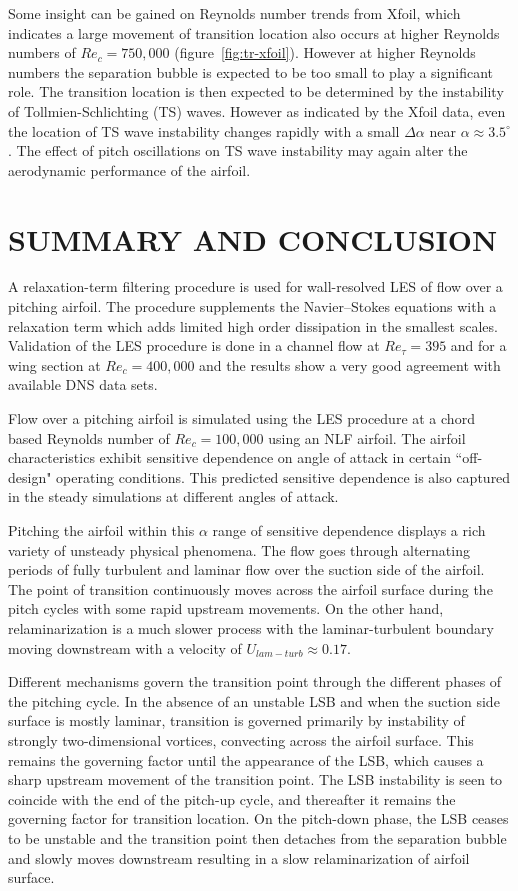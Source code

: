 \documentclass[twocolumn,10pt]{tsfp}
\begin{document}
Some insight can be gained on Reynolds number trends from Xfoil, which indicates a large movement of transition location also occurs at higher Reynolds numbers of $Re_{c}=750,000$ (figure~\ref{fig:tr-xfoil}). However at higher Reynolds numbers the separation bubble is expected to be too small to play a significant role. The transition location is then expected to be determined by the instability of Tollmien-Schlichting (TS) waves. However as indicated by the Xfoil data, even the location of TS wave instability changes rapidly with a small $\Delta\alpha$ near $\alpha\approx 3.5^{\circ}$. The effect of pitch oscillations on TS wave instability may again alter the aerodynamic performance of the airfoil.

\section*{SUMMARY AND CONCLUSION}

A relaxation-term filtering procedure is used for wall-resolved LES of flow over a pitching airfoil. The procedure supplements the Navier--Stokes equations with a relaxation term which adds limited high order dissipation in the smallest scales. Validation of the LES procedure is done in a channel flow at $Re_{\tau}=395$ and for a wing section at $Re_{c}=400,000$ and the results show a very good agreement with available DNS data sets.

Flow over a pitching airfoil is simulated using the LES procedure at a chord based Reynolds number of $Re_{c}=100,000$ using an NLF airfoil. The airfoil characteristics exhibit sensitive dependence on angle of attack in certain ``off-design" operating conditions. This predicted sensitive dependence is also captured in the steady simulations at different angles of attack. 

Pitching the airfoil within this $\alpha$ range of sensitive dependence displays a rich variety of unsteady physical phenomena. The flow goes through alternating periods of fully turbulent and laminar flow over the suction side of the airfoil. The point of transition continuously moves across the airfoil surface during the pitch cycles with some rapid upstream movements. On the other hand, relaminarization is a much slower process with the laminar-turbulent boundary moving downstream with a velocity of $U_{lam-turb}\approx0.17$.

Different mechanisms govern the transition point through the different phases of the pitching cycle. In the absence of an unstable LSB and when the suction side surface is mostly laminar, transition is governed primarily by instability of strongly two-dimensional vortices, convecting across the airfoil surface. This remains the governing factor until the appearance of the LSB, which causes a sharp upstream movement of the transition point. The LSB instability is seen to coincide with the end of the pitch-up cycle, and thereafter it remains the governing factor for transition location. On the pitch-down phase, the LSB ceases to be unstable and the transition point then detaches from the separation bubble and slowly moves downstream resulting in a slow relaminarization of airfoil surface.
\end{document}
